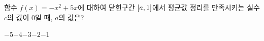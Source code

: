 함수 $f(x)=-x^2+5x$에 대하여 닫힌구간 $[a{,}\mkern3mu\mathopen{}1]$에서 평균값 정리를 만족시키는 실수 $c$의 값이 $0$일 때, $a$의 값은? 
\begin{choices32}{$-5$}{$-4$}{$-3$}{$-2$}{$-1$}\end{choices32}
